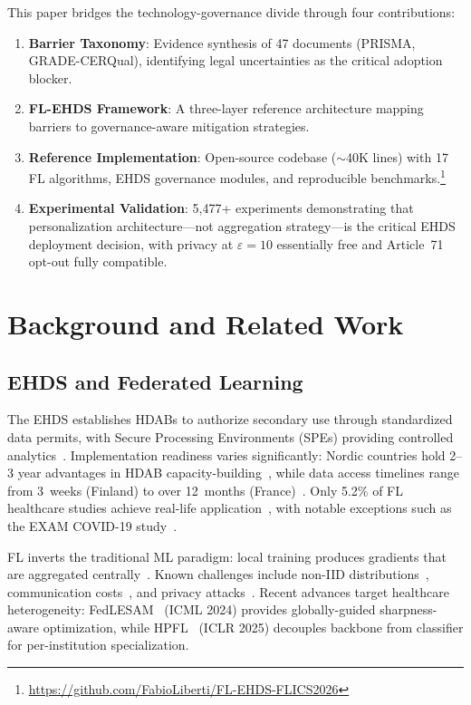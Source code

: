 \documentclass[conference]{IEEEtran}
\begin{document}
This paper bridges the technology-governance divide through four contributions:
\begin{enumerate}
    \item \textbf{Barrier Taxonomy}: Evidence synthesis of 47 documents (PRISMA, GRADE-CERQual), identifying legal uncertainties as the critical adoption blocker.
    \item \textbf{FL-EHDS Framework}: A three-layer reference architecture mapping barriers to governance-aware mitigation strategies.
    \item \textbf{Reference Implementation}: Open-source codebase ($\sim$40K lines) with 17 FL algorithms, EHDS governance modules, and reproducible benchmarks.\footnote{\url{https://github.com/FabioLiberti/FL-EHDS-FLICS2026}}
    \item \textbf{Experimental Validation}: 5,477+ experiments demonstrating that personalization architecture---not aggregation strategy---is the critical EHDS deployment decision, with privacy at $\varepsilon{=}10$ essentially free and Article~71 opt-out fully compatible.
\end{enumerate}

\section{Background and Related Work}
\label{sec:background}

\subsection{EHDS and Federated Learning}

The EHDS establishes HDABs to authorize secondary use through standardized data permits, with Secure Processing Environments (SPEs) providing controlled analytics~\cite{svingel2025hdab}. Implementation readiness varies significantly: Nordic countries hold 2--3 year advantages in HDAB capacity-building~\cite{tehdas2024ready}, while data access timelines range from 3~weeks (Finland) to over 12~months (France)~\cite{forster2025journeys}. Only 5.2\% of FL healthcare studies achieve real-life application~\cite{teo2024systematic}, with notable exceptions such as the EXAM COVID-19 study~\cite{dayan2021federated}.

FL inverts the traditional ML paradigm: local training produces gradients that are aggregated centrally~\cite{mcmahan2017communication}. Known challenges include non-IID distributions~\cite{li2020federated}, communication costs~\cite{bonawitz2019scale}, and privacy attacks~\cite{zhu2019deep, shokri2017membership}. Recent advances target healthcare heterogeneity: FedLESAM~\cite{qu2024fedlesam} (ICML 2024) provides globally-guided sharpness-aware optimization, while HPFL~\cite{chen2025hpfl} (ICLR 2025) decouples backbone from classifier for per-institution specialization.
\end{document}
